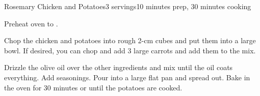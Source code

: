 \documentclass[../Cookbook.tex]{subfiles}
\begin{document}
\begin{recipe}{Rosemary Chicken and Potatoes}{3 servings}{10 minutes prep, 30 minutes cooking}

Preheat oven to .

Chop the chicken and potatoes into rough 2-cm cubes and put them into a large bowl. If desired, you can chop and add 3 large carrots and add them to the mix.

Drizzle the olive oil over the other ingredients and mix until the oil coats everything. Add seasonings. Pour into a large flat pan and spread out. Bake in the oven for 30 minutes or until the potatoes are cooked.


\end{recipe}
\end{document}

